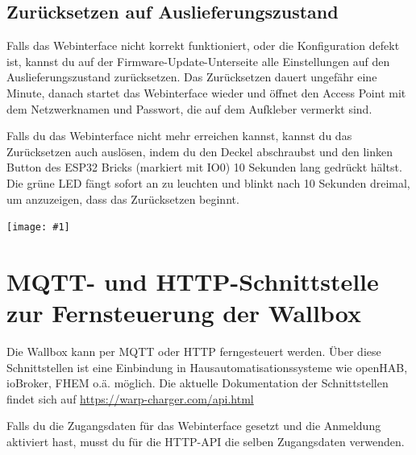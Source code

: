 \documentclass[a4paper,10pt]{article}
\newcommand{\gfx}[1]{\texttt{[image: \#1]}}
\begin{document}
\begin{multicols*}{2}
	\subsection{Zurücksetzen auf Auslieferungszustand}\label{reset}
	Falls das Webinterface nicht korrekt funktioniert, oder die Konfiguration defekt ist,
	kannst du auf der Firmware-Update-Unterseite alle Einstellungen auf den Auslieferungszustand zurücksetzen.
	Das Zurücksetzen dauert ungefähr eine Minute, danach startet das Webinterface wieder und öffnet
	den Access Point mit dem Netzwerknamen und Passwort, die auf dem Aufkleber vermerkt sind.

	Falls du das Webinterface nicht mehr erreichen kannst, kannst du das Zurücksetzen auch
	auslösen, indem du den Deckel abschraubst und den linken Button des ESP32 Bricks (markiert mit IO0)
	10 Sekunden lang gedrückt hältst. Die grüne LED fängt sofort an zu leuchten und blinkt nach 10 Sekunden
	dreimal, um anzuzeigen, dass das Zurücksetzen beginnt.

	\vfill

	\gfx{./img_warp2/resized/warp_esp_open}
	\newpage
	\section{MQTT- und HTTP-Schnittstelle zur Fernsteuerung der Wallbox}
	Die Wallbox kann per MQTT oder HTTP ferngesteuert werden. Über diese Schnittstellen ist eine
	Einbindung in Hausautomatisationssysteme wie openHAB, ioBroker, FHEM o.ä. möglich. Die aktuelle
	Dokumentation der Schnittstellen findet sich auf \url{https://warp-charger.com/api.html}

	Falls du die Zugangsdaten für das Webinterface gesetzt und die Anmeldung aktiviert hast, musst du
	für die HTTP-API die selben Zugangsdaten verwenden.


\end{multicols*}
\end{document}
